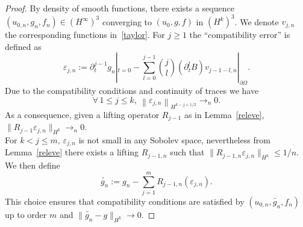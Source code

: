 \documentclass[AHL,Unicode,longabstracts,published]{cedram}
\let\oldforall\forall
\renewcommand*{\forall}{\mathrel{\oldforall}}
\begin{document}
\begin{proof}
By density of smooth functions, there exists a sequence $(u_{0,n},g_n,f_n)\in (H^\infty)^3$ converging to $(u_0,g,f)$ in $(H^k)^3$. We denote $v_{j,n}$ the corresponding functions in~\eqref{taylor}. For $j\geq 1$ the ``compatibility error'' is defined as
\[
\varepsilon_{j,n}:=
\partial_t^{j-1}g_n|_{t=0}
-\sum_{l=0}^{j-1}\binom{j}{l} \left(\partial_t^lB\right)v_{j-1-l,n}|_{\partial\Omega}.
\]
Due to the compatibility conditions and continuity of traces we have
\[
\forall\,1\leq j\leq k,\
\left\|\varepsilon_{j,n}\right\|_{H^{k-j+1/2}}\longrightarrow_{n} 0.
\]
As a consequence, given a lifting operator $R_{j-1}$ as in Lemma~\ref{releve}, $\|R_{j-1}\varepsilon_{j,n}\|_{H^k}\to_n 0$.\\
For $k<j\leq m$, $\varepsilon_{j,n}$ is not small in any Sobolev space, nevertheless from Lemma~\ref{releve} there exists a lifting $R_{j-1,n}$ such that $\|R_{j-1,n}\varepsilon_{j,n}\|_{H^k}
\leq 1/n$. We then define
\[
\widetilde{g_n}:=g_n-\sum_{j=1}^m
R_{j-1,n}(\varepsilon_{j,n}).
\]
This choice ensures that compatibility conditions are satisfied by $(u_{0,n},\widetilde{g_n},f_n)$ up to order $m$ and $\|\widetilde{g_n}-g\|_{H^k}
\to 0$.
\end{proof}
\end{document}
